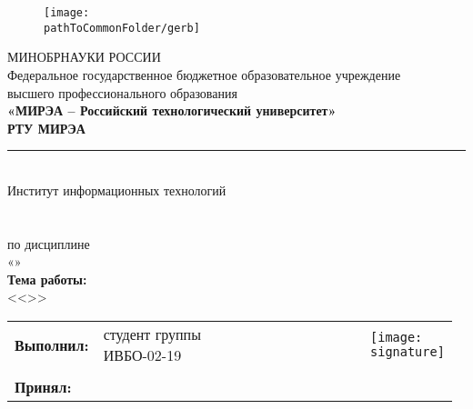 
\begin{center}
	\begin{figure}[h!]
		\begin{center}
		\texttt{[image: \\pathToCommonFolder/gerb]}
		\end{center}	
	\end{figure}
 	\small	МИНОБРНАУКИ РОССИИ \\
	Федеральное государственное бюджетное образовательное учреждение\\
						высшего профессионального образования\\
\normalsize					
\textbf{«МИРЭА – Российский технологический университет»\\
						РТУ МИРЭА}\\
						\noindent\rule{1\linewidth}{1pt}\\
       Институт информационных технологий\\ %
					\kafedra\\
		\vspace{3ex}
			\large \textbf{\workname}  \\
						по дисциплине\\ «\discipline» \\
		\vspace{3ex}
		\if \withouttheme
			\textbf{Тема работы:}\\ <<\theme>>
		\fi
\vspace{3ex}
\small
\begin{table}[h!]
\begin{tabular}{p{0.14\linewidth}p{0.38\linewidth}p{0.25\linewidth}p{0.2\linewidth}}
	\textbf{Выполнил:} & студент группы ИВБО-02-19 & \studentfio &\texttt{[image: \\signature]}\\ \\
	\textbf{Принял:} & \rang & \teacherfio 
\end{tabular}
\end{table}
\end{center}

